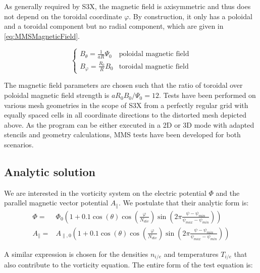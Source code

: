 As generally required by S3X, the magnetic field is axisymmetric and thus does not depend on the toroidal coordinate $\varphi$. By construction, it only has a poloidal and a toroidal component but no radial component, which are given in \autoref{eq:MMSMagneticField}.

\begin{equation}
	\label{eq:MMSMagneticField}
	\begin{cases}
		B_\theta = \frac{1}{aR}\Psi_0 & \text{poloidal magnetic field}  \\
		B_\varphi = \frac{R_0}{R}B_0 & \text{toroidal magnetic field}
	\end{cases}
\end{equation}

The magnetic field parameters are chosen such that the ratio of toroidal over poloidal magnetic field strength is $aR_0B_0/\Psi_0 = 12$. 
Tests have been performed on various mesh geometries in the scope of S3X from a perfectly regular grid with equally spaced cells in all coordinate directions to the distorted mesh depicted above. As the program can be either executed in a 2D or 3D mode with adapted stencils and geometry calculations, MMS tests have been developed for both scenarios.

\subsection{Analytic solution}

We are interested in the vorticity system on the electric potential $\Phi$ and the parallel magnetic vector potential $A_\parallel$. We postulate that their analytic form is: 
\begin{align}
	\Phi =& \Phi_0 \left(1 + 0.1 \cos(\theta)\cos(\frac{\varphi}{N_{div}})\sin(2\pi \frac{\psi-\psi_{min}}{\psi_{max} - \psi_{min}}) \right) \\
	A_\parallel =& A_{\parallel,0} \left(1 + 0.1 \cos(\theta)\cos(\frac{\varphi}{N_{div}})\sin(2\pi \frac{\psi-\psi_{min}}{\psi_{max} - \psi_{min}}) \right)
	\label{eq:MMSAnalyticFormPhiAPara}
\end{align}

A similar expression is chosen for the densities $n_{i/e}$ and temperatures $T_{i/e}$ that also contribute to the vorticity equation. The entire form of the test equation is:

